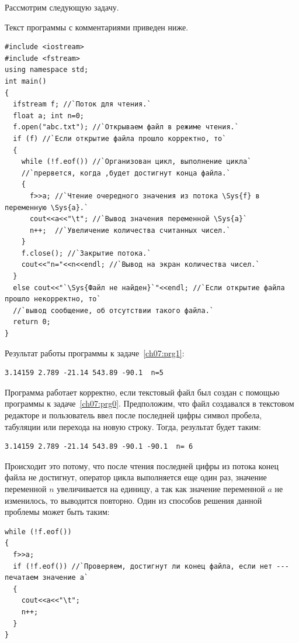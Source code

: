Рассмотрим следующую задачу.


Текст программы с комментариями приведен ниже.
\begin{lstlisting}
#include <iostream>
#include <fstream>
using namespace std;
int main()
{
  ifstream f; //`Поток для чтения.`
  float a; int n=0;
  f.open("abc.txt"); //`Открываем файл в режиме чтения.`
  if (f) //`Если открытие файла	прошло корректно, то`
  {
    while (!f.eof()) //`Организован цикл, выполнение цикла`
    //`прервется, когда ,будет достигнут конца файла.`
    {
      f>>a; //`Чтение очередного значения из потока \Sys{f} в переменную \Sys{a}.`
      cout<<a<<"\t"; //`Вывод значения переменной \Sys{a}` 
      n++;  //`Увеличение количества считанных чисел.`
    }
    f.close(); //`Закрытие потока.`
    cout<<"n="<<n<<endl; //`Вывод на экран количества чисел.`
  }
  else cout<<"`\Sys{Файл не найден}`"<<endl; //`Если открытие файла прошло некорректно, то`
  //`вывод сообщение, об отсутствии такого файла.`
  return 0;
}
\end{lstlisting}

Результат работы программы к задаче~\ref{ch07:prg1}:
\begin{verbatim}
3.14159 2.789 -21.14 543.89 -90.1  n=5
\end{verbatim}

Программа работает корректно, если текстовый файл  был создан с помощью 
программы к задаче~\ref{ch07:prg0}. Предположим, что файл создавался в текстовом редакторе 
и пользователь ввел после последней цифры символ пробела, табуляции или перехода на новую строку. 
Тогда, результат будет таким:
\begin{verbatim}
3.14159 2.789 -21.14 543.89 -90.1 -90.1  n= 6
\end{verbatim}

Происходит это потому, что после чтения последней цифры из потока конец файла не достигнут, оператор 
цикла выполняется еще один раз, значение переменной $n$ увеличивается на единицу, а так как значение 
переменной $a$ не изменилось, то выводится повторно. Один из способов решения данной проблемы может быть таким:
\begin{lstlisting}
while (!f.eof())
{
  f>>a;
  if (!f.eof()) //`Проверяем, достигнут ли конец файла, если нет --- печатаем значение a`
  {
    cout<<a<<"\t";
    n++;
  }
}
\end{lstlisting}

